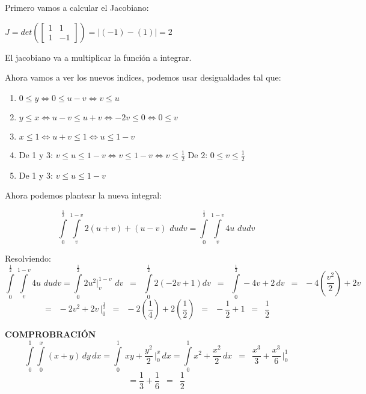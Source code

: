 \noindent Primero vamos a calcular el Jacobiano:
\begin{center}
    $J = det(\begin{bmatrix}
        1 & 1\\
        1 & -1
    \end{bmatrix}) = | (-1)-(1)| = 2$
\end{center}
\noindent El jacobiano va a multiplicar la función a integrar.
\vspace{12pt}

\noindent Ahora vamos a ver los nuevos indices, podemos usar desigualdades tal que:
\begin{enumerate}
    \item $0 \leq y \iff 0 \leq u-v \iff v \leq u$
    \item $y \leq x \iff u-v \leq u+v \iff -2v \leq 0 \iff 0 \leq v$
    \item $x \leq 1 \iff u+v \leq 1 \iff u \leq 1-v$
    \item De 1 y 3: $v \leq u \leq 1-v \iff v\leq 1-v \iff v\leq \frac{1}{2}$ De 2: $0 \leq v \leq \frac{1}{2}$
    \item De 1 y 3: $v \leq u \leq 1-v$
\end{enumerate}
\vspace{12pt}

\noindent Ahora podemos plantear la nueva integral:

\[\int\limits_0^{\frac{1}{2}} \int\limits_v^{1-v} 2(u+v)+(u-v) \,\, dudv = \int\limits_0^{\frac{1}{2}} \int\limits_v^{1-v} 4u \,\, dudv\]
\vspace{12pt}

\noindent Resolviendo:
\[\int\limits_0^{\frac{1}{2}} \int\limits_v^{1-v} 4u \,\, dudv = \int\limits_0^{\frac{1}{2}} 2u^2 \bigg|_v^{1-v} \,\, dv \,\,\, = \,\,\, \int\limits_0^{\frac{1}{2}} 2(-2v+1) dv \,\,\, = \,\,\, \int\limits_0^{\frac{1}{2}} -4v+2 \, dv \,\,\, = \,\,\, -4(\frac{v^2}{2})+2v \,\,\, \]
\[= \,\,\, -2v^2 + 2v \, \bigg|_0^{\frac{1}{2}} \,\,\, = \,\,\, -2(\frac{1}{4}) + 2(\frac{1}{2}) \,\,\, = \,\,\, -\frac{1}{2} + 1 \,\,\, = \,\,\, \frac{1}{2}\]
\vspace{12pt}

\textbf{COMPROBRACIÓN}
\[\displaystyle\int\limits_0^1 \int\limits_0^x (x+y) \, dy \, dx = \int\limits_0^1 \, xy + \frac{y^2}{2} \, \bigg|_0^x \, dx = \int\limits_0^1 x^2 + \frac{x^2}{2} \, dx \,\,\, = \,\,\, \frac{x^3}{3} + \frac{x^3}{6} \, \bigg|_0^1\]
\[\displaystyle = \frac{1}{3} + \frac{1}{6} \,\,\, = \,\,\, \frac{1}{2}\]
